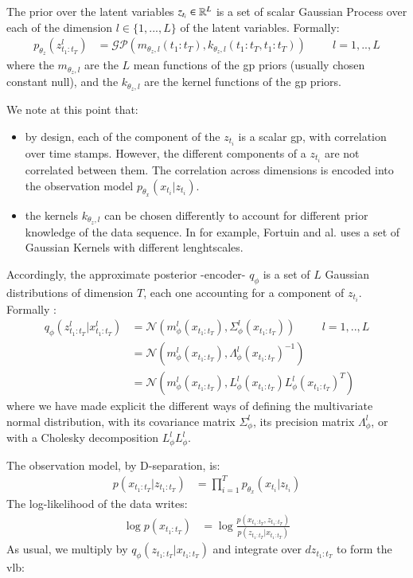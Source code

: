 The prior over the latent variables $z_{t_i} \in \mathbb{R}^L$ is a set of scalar Gaussian Process over each of the dimension $l \in \{1,...,L\}$ of the latent variables. Formally:
\begin{align}
    p_{\theta_z}(z_{t_1:t_T}^l) &= \mathcal{GP}(m_{\theta_z, l}(t_1:t_T), k_{\theta_z, l}(t_1:t_T, t_1:t_T)) \hspace{1cm} l=1,..,L
\end{align}
where the $m_{\theta_z, l}$ are the $L$ mean functions of the \gls{gp} priors (usually chosen constant null), and the $k_{\theta_z, l}$ are the kernel functions of the \gls{gp} priors.

We note at this point that:
\begin{itemize}
    \item by design, each of the component of the $z_{t_i}$ is a scalar \gls{gp}, with correlation over time stamps. However, the different components of a $z_{t_i}$ are not correlated between them. The correlation across dimensions is encoded into the observation model $p_{\theta_x}(x_{t_i} \vert z_{t_i})$.
    \item the kernels $k_{\theta_z, l}$ can be chosen differently to account for different prior knowledge of the data sequence. In \cite{fortuin_gp-vae:_2020} for example, Fortuin and al. uses a set of Gaussian Kernels with different lenghtscales.
\end{itemize}

Accordingly, the approximate posterior -encoder- $q_\phi$ is a set of $L$ Gaussian distributions of dimension $T$, each one accounting for a component of $z_{t_i}$. Formally :
\begin{align}
    q_\phi(z_{t_1:t_T}^l \vert x_{t_1:t_T}^l) &= \mathcal{N}(m_{\phi}^l(x_{t_1:t_T}), \Sigma_{\phi}^l(x_{t_1:t_T})) \hspace{1cm} l=1,..,L \\
    &= \mathcal{N}(m_{\phi}^l(x_{t_1:t_T}), \Lambda_{\phi}^l(x_{t_1:t_T})^{-1}) \\
    &= \mathcal{N}(m_{\phi}^l(x_{t_1:t_T}), L_{\phi}^l(x_{t_1:t_T})L_{\phi}^l(x_{t_1:t_T})^T)
\end{align}
where we have made explicit the different ways of defining the multivariate normal distribution, with its covariance matrix $\Sigma_\phi^l$, its precision matrix $\Lambda_\phi^l$, or with a Cholesky decomposition $L_{\phi}^lL_{\phi}^l$.

The observation model, by D-separation, is:
\begin{align}
\label{obs_gpvae}
    p(x_{t_1:t_T} \vert z_{t_1:t_T}) &= \prod_{i=1}^T p_{\theta_x}(x_{t_i} \vert z_{t_i})
\end{align}
The log-likelihood of the data writes:
\begin{align}
    \log{p(x_{t_1:t_T})} &= \log{\frac{p(x_{t_1:t_T}, z_{t_1:t_T})}{p(z_{t_1:t_T} \vert x_{t_1:t_T})}}
\end{align}
As usual, we multiply by $q_{\phi}(z_{t_1:t_T} \vert x_{t_1:t_T})$ and integrate over $dz_{t_1:t_T}$ to form the \gls{vlb}:

